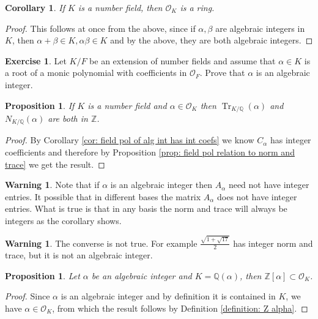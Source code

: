 \documentclass[11pt,a4paper]{report}
\theoremstyle{plain}
\newtheorem{corollary}[subsection]{Corollary}
\newtheorem{prop}[subsection]{Proposition}
\theoremstyle{definition}
\theoremstyle{definition}
\newtheorem{warn}[subsection]{Warning}
\newtheorem{question}[subsection]{Exercise}
\newcommand{\Tr}{\operatorname{Tr}}
\newcommand{\ZZ}{\mathbb{Z}}
\def\QQ{\mathbb{Q}}
\def \a{\alpha}
\def \OO {\mathcal{O}}
\begin{document}
	\begin{corollary}
		If $K$ is a number field, then $\OO_K$ is a ring.
	\end{corollary}
	
	\begin{proof}
		This follows at once from the above, since if $\a,\beta$ are algebraic integers in $K$, then $\a+\beta \in K, \a \beta \in K$ and by the above, they are both algebraic integers.
	\end{proof}
	
	\begin{question}\label{quest: ints in tower law}
		Let $K/F$ be an extension of number fields and assume that $\a \in K$ is a root of a monic polynomial with coefficients in $\OO_F$. Prove that $\a$ is an algebraic integer.
	\end{question}
	
	\begin{prop}\label{prop: norm trace of alg int is int}
		If $K$ is a number field and $\a \in \OO_K$ then $\Tr_{K/\QQ}(\a)$ and $N_{K/\QQ}(\a)$ are both in $\ZZ$. 
	\end{prop}
	
	\begin{proof}
		By Corollary \ref{cor: field pol of alg int has int coefs} we know $C_\a$ has integer coefficients and therefore by Proposition \ref{prop: field pol relation to norm and trace} we get the result.
		
		
	\end{proof}
	
	
	\begin{warn}
		Note  that if $\a$ is an algebraic integer then $A_\a$ need not have  integer entries. It possible that in different bases the matrix $A_\a$ does not have integer entries. What is true is that in any basis the norm and trace will always be integers as the corollary shows.
	\end{warn}
	
	
	\begin{warn}
		The converse is not true. For example $\frac{\sqrt{1+\sqrt{17}}}{2}$ has integer norm and trace, but it is not an algebraic integer. 
	\end{warn}
	
	
	
	
	\begin{prop}
		Let $\a$ be an algebraic integer and $K=\QQ(\a)$, then $\ZZ[\a] \subset \OO_K$.
	\end{prop}
	
	\begin{proof}
		Since $\a$ is an algebraic integer and by definition it is contained in $K$, we have $\a \in \OO_K$, from which the result follows by Definition \ref{definition: Z alpha}.
	\end{proof}
	
\end{document}
